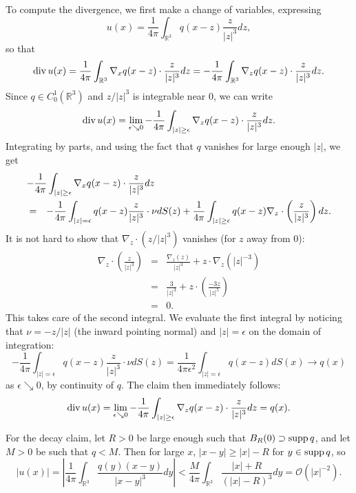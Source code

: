 \documentclass{article}
\def\div{\mathop{\rm div}\nolimits}
\def\supp{\mathop{\rm supp}\nolimits}
\begin{document}
\begin{enumerate}
To compute the divergence, we first make a change of variables, expressing
\[u(x) = \frac{1}{4 \pi} \int_{\mathbb{R}^3} q(x - z) \frac{z}{|z|^3} dz,\]
so that
\[\div u(x) = \frac{1}{4 \pi} \int_{\mathbb{R}^3} \nabla_x q(x - z) \cdot \frac{z}{|z|^3} dz
            = -\frac{1}{4 \pi} \int_{\mathbb{R}^3} \nabla_z q(x - z) \cdot \frac{z}{|z|^3} dz.\]
Since \(q \in C^1_0(\mathbb{R}^3)\) and \(z / |z|^3\) is integrable near \(0\), we can write
\[\div u(x) = \lim_{\epsilon \searrow 0} -\frac{1}{4 \pi} \int_{|z| \geq \epsilon} \nabla_z q(x - z) \cdot \frac{z}{|z|^3} dz.\]
Integrating by parts, and using the fact that \(q\) vanishes for large enough \(|z|\), we get
\begin{eqnarray*}
\lefteqn{-\frac{1}{4 \pi} \int_{|z| \geq \epsilon} \nabla_x q(x - z) \cdot \frac{z}{|z|^3} dz} \\
& = & -\frac{1}{4 \pi} \int_{|z| = \epsilon} q(x - z) \frac{z}{|z|^3} \cdot \nu dS(z)
    + \frac{1}{4 \pi} \int_{|z| \geq \epsilon} q(x - z) \nabla_z \cdot \left( \frac{z}{|z|^3} \right) dz.
\end{eqnarray*}
It is not hard to show that \(\nabla_z \cdot \left( z / |z|^3 \right)\) vanishes (for \(z\) away from \(0\)):
\begin{eqnarray*}
\nabla_z \cdot \left( \frac{z}{|z|^3} \right)
& = & \frac{\nabla_z(z)}{|z|^3} + z \cdot \nabla_z \left( |z|^{-3} \right) \\
& = & \frac{3}{|z|^3} + z \cdot \left( \frac{-3 z}{|z|^5} \right) \\
& = & 0.
\end{eqnarray*}
This takes care of the second integral.  We evaluate the first integral by noticing that \(\nu = -z / |z|\) (the inward pointing normal) and \(|z| = \epsilon\) on the domain of integration:
\[-\frac{1}{4 \pi} \int_{|z| = \epsilon} q(x - z) \frac{z}{|z|^3} \cdot \nu dS(z)
  = \frac{1}{4 \pi \epsilon^2} \int_{|z| = \epsilon} q(x - z) dS(x)
  \to q(x)\]
as \(\epsilon \searrow 0\), by continuity of \(q\).  The claim then immediately follows:
\[\div u(x) = \lim_{\epsilon \searrow 0} -\frac{1}{4 \pi} \int_{|z| \geq \epsilon} \nabla_z q(x - z) \cdot \frac{z}{|z|^3} dz = q(x).\]

For the decay claim, let \(R > 0\) be large enough such that \(B_R(0) \supset \supp q\), and let \(M > 0\) be such that \(q < M\).  Then for large \(x\), \(|x - y| \geq |x| - R\) for \(y \in \supp q\), so
\[|u(x)| = \left| \frac{1}{4 \pi} \int_{\mathbb{R}^3} \frac{q(y) (x - y)}{|x - y|^3} dy \right|
         < \frac{M}{4 \pi} \int_{\mathbb{R}^3} \frac{|x| + R}{(|x| - R)^3} dy
         = \mathcal{O}(|x|^{-2}).\]


\end{enumerate}
\end{document}

